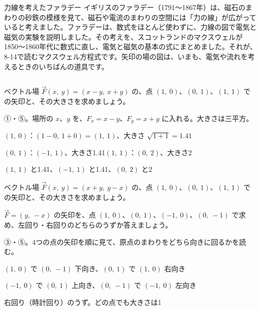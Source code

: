 \begin{column}{力線を考えたファラデー}
イギリスのファラデー（1791〜1867年）は、磁石のまわりの砂鉄の模様を見て、磁石や電流のまわりの空間には「力の線」が広がっていると考えました。ファラデーは、数式をほとんど使わずに、力線の図で電気と磁気の実験を説明しました。その考えを、スコットランドのマクスウェルが1850〜1860年代に数式に直し、電気と磁気の基本の式にまとめました。それが、8-14で読むマクスウェル方程式です。矢印の場の図は、いまも、電気や流れを考えるときのいちばんの道具です。
\end{column}


\begin{reidai}[場の矢印を計算する]
ベクトル場 $\vec F(x,\ y)=(x-y,\ x+y)$ の、点 $(1,\ 0)$、$(0,\ 1)$、$(1,\ 1)$ での矢印と、その大きさを求めましょう。\par
\kangaekata ①・⑤。場所の $x$、$y$ を、$F_x=x-y$、$F_y=x+y$ に入れる。大きさは三平方。\par
\shiki\kviiifs{}\zw{} $(1,\ 0)$：$(1-0,\ 1+0)=(1,\ 1)$、大きさ $\sqrt{1+1}=1.41$\par
\kviiifa $(0,\ 1)$：$(-1,\ 1)$、大きさ1.41\qquad $(1,\ 1)$：$(0,\ 2)$、大きさ2\par
\kotae\kviiifs{}\zw{} $(1,\ 1)$ と1.41、$(-1,\ 1)$ と1.41、$(0,\ 2)$ と2
\end{reidai}

\begin{jibun}
ベクトル場 $\vec F(x,\ y)=(x+y,\ y-x)$ の、点 $(1,\ 0)$、$(0,\ 1)$、$(1,\ 1)$ での矢印と、その大きさを求めましょう。
\end{jibun}

\begin{reidai}[うずの回る向きを調べる]
$\vec F=(y,\ -x)$ の矢印を、点 $(1,\ 0)$、$(0,\ 1)$、$(-1,\ 0)$、$(0,\ -1)$ で求め、左回り・右回りのどちらのうずか答えましょう。\par
\kangaekata ③・⑤。4つの点の矢印を順に見て、原点のまわりをどちら向きに回るかを読む。\par
\shiki\kviiifs{}\zw{} $(1,\ 0)$ で $(0,\ -1)$ 下向き、$(0,\ 1)$ で $(1,\ 0)$ 右向き\par
\kviiifa $(-1,\ 0)$ で $(0,\ 1)$ 上向き、$(0,\ -1)$ で $(-1,\ 0)$ 左向き\par
\kotae\kviiifs{}\zw{} 右回り（時計回り）のうず。どの点でも大きさは1
\end{reidai}

